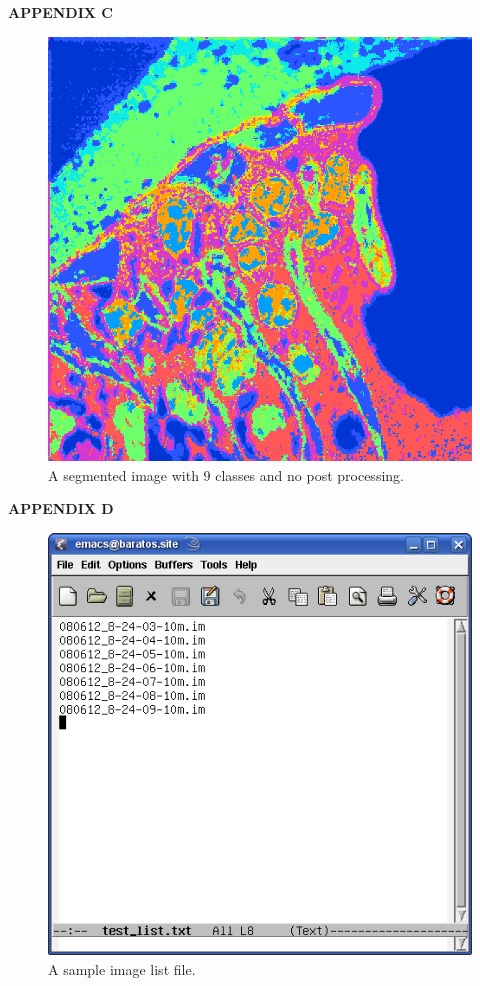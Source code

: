 \documentclass{article}
\begin{document}
\newpage
\begin{center}\LARGE{\textbf{APPENDIX C}}\end{center} 
\vfill
\begin{figure}[ht]
\centering
\includegraphics[scale=0.5]{seg_lechene_94p.png}
\caption{A segmented image with 9 classes and no post processing. }
\end{figure}
\vfill


\newpage
\begin{center}\LARGE{\textbf{APPENDIX D}}\end{center} 
\vfill
\begin{figure}[ht]
\centering
\includegraphics[scale=0.75]{snapshot_ImageList.png}
\caption{A sample image list file.}
\end{figure}
\vfill
\end{document}
